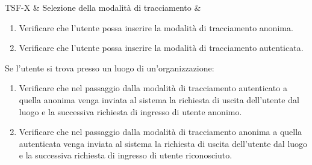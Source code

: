 TSF-X & Selezione della modalità di tracciamento & \begin{enumerate}
    \item Verificare che l'utente possa inserire la modalità di tracciamento anonima.
    \item Verificare che l'utente possa inserire la modalità di tracciamento autenticata.
\end{enumerate}
Se l'utente si trova presso un luogo di un'organizzazione:
\begin{enumerate}
    \item Verificare che nel passaggio dalla modalità di tracciamento autenticato a quella anonima venga inviata al sistema la richiesta di uscita dell'utente dal luogo e la successiva richiesta di ingresso di utente anonimo.
    \item Verificare che nel passaggio dalla modalità di tracciamento anonima a quella autenticata venga inviata al sistema la richiesta di uscita dell'utente dal luogo e la successiva richiesta di ingresso di utente riconosciuto.
\end{enumerate} \\

